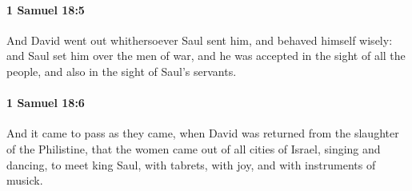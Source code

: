 		\paragraph{1 Samuel 18:5} %
			\label{1SAMUEL-18-5}

			And David went out whithersoever Saul sent him, and behaved himself wisely: and Saul set him over the men of war, and he was accepted in the sight of all the people, and also in the sight of Saul’s servants.


		\paragraph{1 Samuel 18:6} %
			\label{1SAMUEL-18-6}

			And it came to pass as they came, when David was returned from the slaughter of the Philistine, that the women came out of all cities of Israel, singing and dancing, to meet king Saul, with tabrets, with joy, and with instruments of musick.

